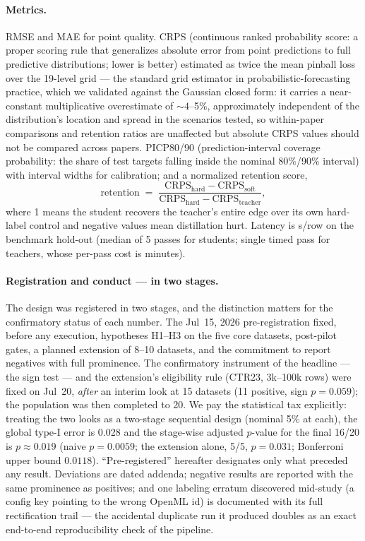 \documentclass[11pt]{article}
\newcommand{\us}{\textmu s}
\begin{document}
\paragraph{Metrics.} RMSE and MAE for point quality. CRPS (continuous
ranked probability score: a proper scoring rule that generalizes absolute
error from point predictions to full predictive distributions; lower is
better) estimated as twice the mean pinball loss over the 19-level grid
\citep{gneiting2011} --- the standard grid estimator in
probabilistic-forecasting practice, which we validated against the
Gaussian closed form: it carries a near-constant multiplicative
overestimate of ${\sim}4$--5\%, approximately independent of the
distribution's location and spread in the scenarios tested, so
within-paper comparisons and retention ratios are unaffected but absolute
CRPS values should not be compared across papers. PICP80/90
(prediction-interval coverage probability: the share of test targets
falling inside the nominal 80\%/90\% interval) with interval widths for
calibration; and a normalized retention score,
\begin{equation}
  \mathrm{retention} \;=\;
  \frac{\mathrm{CRPS}_{\mathrm{hard}} - \mathrm{CRPS}_{\mathrm{soft}}}
       {\mathrm{CRPS}_{\mathrm{hard}} - \mathrm{CRPS}_{\mathrm{teacher}}},
\end{equation}
where 1 means the student recovers the teacher's entire edge over its own
hard-label control and negative values mean distillation hurt. Latency is
\us/row on the benchmark hold-out (median of 5 passes for students; single
timed pass for teachers, whose per-pass cost is minutes).

\paragraph{Registration and conduct --- in two stages.} The design was
registered in two stages, and the distinction matters for the
confirmatory status of each number. The Jul~15, 2026 pre-registration
fixed, before any execution, hypotheses H1--H3 on the five core
datasets, post-pilot gates, a planned extension of 8--10 datasets, and
the commitment to report negatives with full prominence. The
confirmatory instrument of the headline --- the sign test --- and the
extension's eligibility rule (CTR23, 3k--100k rows) were fixed on
Jul~20, \emph{after} an interim look at 15 datasets (11 positive, sign
$p=0.059$); the population was then completed to 20. We pay the
statistical tax explicitly: treating the two looks as a two-stage
sequential design (nominal 5\% at each), the global type-I error is
0.028 and the stage-wise adjusted $p$-value for the final 16/20 is
$p \approx 0.019$ (naive $p=0.0059$; the extension alone, 5/5,
$p=0.031$; Bonferroni upper bound $0.0118$). ``Pre-registered''
hereafter designates only what preceded any result. Deviations are
dated addenda;
negative results are reported with the same prominence as positives; and
one labeling erratum discovered mid-study (a config key pointing to the
wrong OpenML id) is documented with its full rectification trail --- the
accidental duplicate run it produced doubles as an exact end-to-end
reproducibility check of the pipeline.
\end{document}
